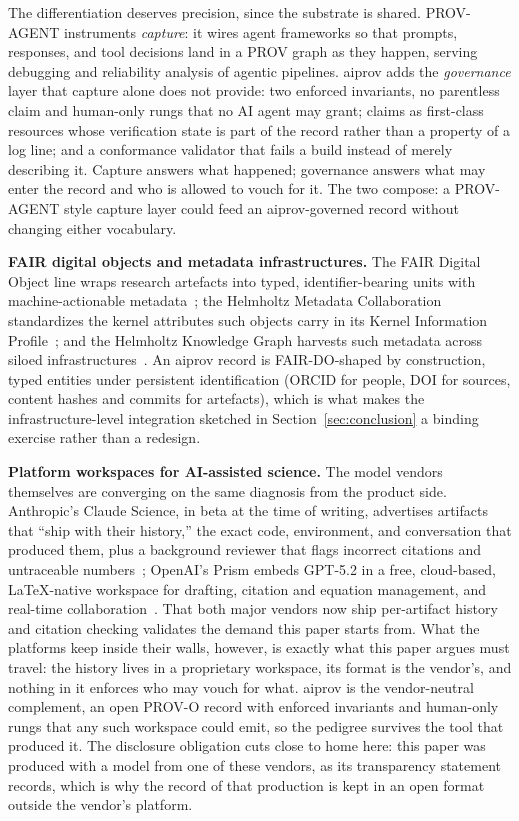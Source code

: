 The differentiation deserves precision, since the substrate is
shared. PROV-AGENT instruments \emph{capture}: it wires agent
frameworks so that prompts, responses, and tool decisions land in a
PROV graph as they happen, serving debugging and reliability analysis
of agentic pipelines. aiprov adds the \emph{governance} layer that
capture alone does not provide: two enforced invariants, no
parentless claim and human-only rungs that no AI agent may grant;
claims as first-class resources whose verification state is part of
the record rather than a property of a log line; and a conformance
validator that fails a build instead of merely describing it. Capture
answers what happened; governance answers what may enter the record
and who is allowed to vouch for it. The two compose: a PROV-AGENT
style capture layer could feed an aiprov-governed record without
changing either vocabulary.

\textbf{FAIR digital objects and metadata infrastructures.} The FAIR
Digital Object line wraps research artefacts into typed, identifier-bearing
units with machine-actionable metadata~\cite{fairdo2020}; the
Helmholtz Metadata Collaboration standardizes the kernel attributes
such objects carry in its Kernel Information
Profile~\cite{hmc-kip2022}; and the Helmholtz Knowledge Graph
harvests such metadata across siloed
infrastructures~\cite{unhide-helmholtz-kg}. An aiprov record is
FAIR-DO-shaped by construction, typed entities under persistent
identification (ORCID for people, DOI for sources, content hashes
and commits for artefacts), which is what makes the
infrastructure-level integration sketched in
Section~\ref{sec:conclusion} a binding exercise rather than a
redesign.

\textbf{Platform workspaces for AI-assisted science.} The model
vendors themselves are converging on the same diagnosis from the
product side. Anthropic's Claude Science, in beta at the time of
writing, advertises artifacts that ``ship with their history,'' the
exact code, environment, and conversation that produced them, plus a
background reviewer that flags incorrect citations and untraceable
numbers~\cite{claude-science2026}; OpenAI's Prism embeds GPT-5.2 in
a free, cloud-based, LaTeX-native workspace for drafting, citation
and equation management, and real-time
collaboration~\cite{openai-prism2026}. That both major vendors now
ship per-artifact history and citation checking validates the demand
this paper starts from. What the platforms keep inside their walls,
however, is exactly what this paper argues must travel: the history
lives in a proprietary workspace, its format is the vendor's, and
nothing in it enforces who may vouch for what. aiprov is the
vendor-neutral complement, an open PROV-O record with enforced
invariants and human-only rungs that any such workspace could emit,
so the pedigree survives the tool that produced it. The disclosure
obligation cuts close to home here: this paper was produced with a
model from one of these vendors, as its transparency statement
records, which is why the record of that production is
kept in an open format outside the vendor's platform.
